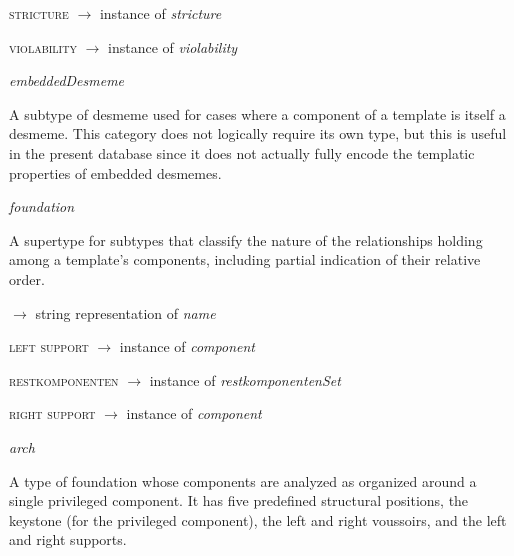 \begin{ontologytop}
\begin{classlist}
\begin{classlist}
\begin{proplist}
			\item \textsc{stricture} $\rightarrow$ instance of \emph{stricture}

			\item \textsc{violability} $\rightarrow$ instance of \emph{violability}

			\end{proplist}

			\begin{classlist}

			\item \emph{embeddedDesmeme}
			\hspace{1em}\parbox[t]{\linegoal}{\footnotesize A subtype of desmeme used for cases where a component of a template is itself a desmeme. This category does not logically require its own type, but this is useful in the present database since it does not actually fully encode the templatic properties of embedded desmemes.}


			\end{classlist}

		\end{classlist}

	\end{classlist}

\item \emph{foundation}
\hspace{1em}\parbox[t]{\linegoal}{\footnotesize A supertype for subtypes that classify the nature of the relationships holding among a template's components, including partial indication of their relative order.}


	\begin{proplist}

	\item \textsc{\name} $\rightarrow$ string representation of \emph{name}

	\item \textsc{left support} $\rightarrow$ instance of \emph{component}

	\item \textsc{restkomponenten} $\rightarrow$ instance of \emph{restkomponentenSet}

	\item \textsc{right support} $\rightarrow$ instance of \emph{component}

	\end{proplist}

	\begin{classlist}

	\item \emph{arch}
	\hspace{1em}\parbox[t]{\linegoal}{\footnotesize A type of foundation whose components are analyzed as organized around a single privileged component. It has five predefined structural positions, the keystone (for the privileged component), the left and right voussoirs, and the left and right supports.}



\end{classlist}
\end{ontologytop}
